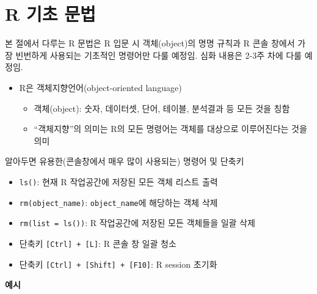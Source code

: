 \documentclass[
  11pt,
]{krantz}
\makeatletter
\providecommand{\tightlist}{%
  \setlength{\itemsep}{0pt}\setlength{\parskip}{0pt}}
\newenvironment{kframe}{%
\medskip{}
\setlength{\fboxsep}{.8em}
 \def\at@end@of@kframe{}%
 \ifinner\ifhmode%
  \def\at@end@of@kframe{\end{minipage}}%
  \begin{minipage}{\columnwidth}%
 \fi\fi%
 \def\FrameCommand##1{\hskip\@totalleftmargin \hskip-\fboxsep
 \colorbox{shadecolor}{##1}\hskip-\fboxsep
     \hskip-\linewidth \hskip-\@totalleftmargin \hskip\columnwidth}%
 \MakeFramed {\advance\hsize-\width
   \@totalleftmargin\z@ \linewidth\hsize
   \@setminipage}}%
 {\par\unskip\endMakeFramed%
 \at@end@of@kframe}
\newenvironment{rmdblock}[1]
  {
  \begin{itemize}
  \renewcommand{\labelitemi}{
    \raisebox{-.7\height}[0pt][0pt]{
      {\setkeys{Gin}{width=3em,keepaspectratio}\texttt{[image: images/\#1]}}
    }
  }
  \setlength{\fboxsep}{1em}
  \begin{kframe}
  \item
  }
  {
  \end{kframe}
  \end{itemize}
  }
\newenvironment{rmdnote}
  {\begin{rmdblock}{note}}
  {\end{rmdblock}}
\newenvironment{rmdtip}
  {\begin{rmdblock}{tip}}
  {\end{rmdblock}}
\makeatother
\begin{document}
\normalsize

\hypertarget{r-basic}{%
\section{R 기초 문법}\label{r-basic}}

\footnotesize

\begin{rmdnote}
\begin{rmdnote}

본 절에서 다루는 R 문법은 R 입문 시 객체(object)의 명명 규칙과 R 콘솔 창에서 가장 빈번하게 사용되는 기초적인 명령어만 다룰 예정임. 심화 내용은 2-3주 차에 다룰 예정임.

\end{rmdnote}
\end{rmdnote}

\normalsize

\begin{itemize}
\tightlist
\item
  R은 객체지향언어(object-oriented language)

  \begin{itemize}
  \tightlist
  \item
    객체(object): 숫자, 데이터셋, 단어, 테이블, 분석결과 등 모든 것을 칭함
  \item
    ``객체지향''의 의미는 R의 모든 명령어는 객체를 대상으로 이루어진다는 것을 의미
  \end{itemize}
\end{itemize}

\footnotesize

\begin{rmdtip}
\begin{rmdtip}

알아두면 유용한(콘솔창에서 매우 많이 사용되는) 명령어 및 단축키

\begin{itemize}
\tightlist
\item
  \texttt{ls()}: 현재 R 작업공간에 저장된 모든 객체 리스트 출력
\item
  \texttt{rm(object\_name)}: \texttt{object\_name}에 해당하는 객체 삭제
\item
  \texttt{rm(list\ =\ ls())}: R 작업공간에 저장된 모든 객체들을 일괄 삭제
\item
  단축키 \texttt{{[}Ctrl{]}\ +\ {[}L{]}}: R 콘솔 창 일괄 청소
\item
  단축키 \texttt{{[}Ctrl{]}\ +\ {[}Shift{]}\ +\ {[}F10{]}}: R session 초기화
\end{itemize}

\textbf{예시}

\end{rmdtip}
\end{rmdtip}
\end{document}
